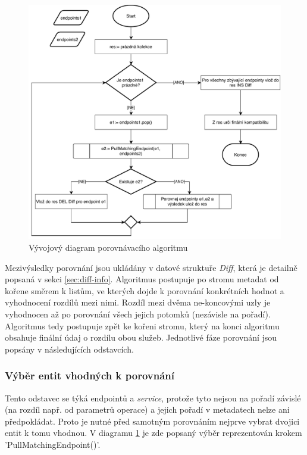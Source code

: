 \documentclass[czech,DP]{thesiskiv}
\begin{document}
\begin{figure}[h]
	\centering
	\includegraphics[width=\linewidth]{apicomp-flow}
	\caption{Vývojový diagram porovnávacího algoritmu}
	\label{fig:apicomp-flow}
\end{figure}

Mezivýsledky porovnání jsou ukládány v datové struktuře \textit{Diff}, která je detailně popsaná v sekci \ref{sec:diff-info}. Algoritmus postupuje po stromu metadat od kořene směrem k listům, ve kterých dojde k porovnání konkrétních hodnot a vyhodnocení rozdílů mezi nimi. Rozdíl mezi dvěma ne-koncovými uzly je vyhodnocen až po porovnání všech jejich potomků (nezávisle na pořadí). Algoritmus tedy postupuje zpět ke kořeni stromu, který na konci algoritmu obsahuje finální údaj o rozdílu obou služeb. Jednotlivé fáze porovnání jsou popsány v následujících odstavcích.

\subsubsection{Výběr entit vhodných k porovnání}
\label{sec:pick-matching-entities}

Tento odstavec se týká endpointů a \textit{service}, protože tyto nejsou na pořadí závislé (na rozdíl např. od parametrů operace) a jejich pořadí v metadatech nelze ani předpokládat. Proto je nutné před samotným porovnáním nejprve vybrat dvojici entit k tomu vhodnou. V diagramu \ref{fig:apicomp-flow} je zde popsaný výběr reprezentován krokem 'PullMatchingEndpoint()'. 
\end{document}
